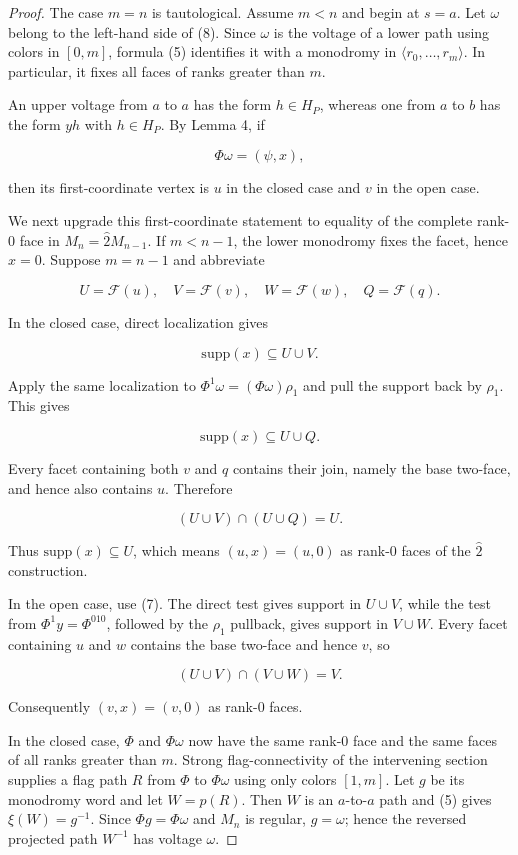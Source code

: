 \documentclass[11pt]{article}
\begin{document}
\begin{proof}

The case $m=n$ is tautological. Assume $m<n$ and begin at $s=a$. Let $\omega$ belong to the
left-hand side of (8). Since $\omega$ is the voltage of a lower path using colors in $[0,m]$, formula
(5) identifies it with a monodromy in $\langle r_0,\ldots,r_m\rangle$. In particular, it fixes all
faces of ranks greater than $m$.

An upper voltage from $a$ to $a$ has the form $h\in H_P$, whereas one from $a$ to $b$ has the form
$yh$ with $h\in H_P$. By Lemma 4, if

\[
\Phi\omega=(\psi,x),
\]

then its first-coordinate vertex is $u$ in the closed case and $v$ in the open case.

We next upgrade this first-coordinate statement to equality of the complete rank-$0$ face in
$M_n=\widehat2M_{n-1}$. If $m<n-1$, the lower monodromy fixes the facet, hence $x=0$. Suppose
$m=n-1$ and abbreviate

\[
U=\mathcal F(u),\quad V=\mathcal F(v),\quad
W=\mathcal F(w),\quad Q=\mathcal F(q).
\]

In the closed case, direct localization gives

\[
\mathrm{supp}(x)\subseteq U\cup V.
\]

Apply the same localization to $\Phi^1\omega=(\Phi\omega)\rho_1$ and pull the support back by
$\rho_1$. This gives

\[
\mathrm{supp}(x)\subseteq U\cup Q.
\]

Every facet containing both $v$ and $q$ contains their join, namely the base two-face, and hence also
contains $u$. Therefore

\[
(U\cup V)\cap(U\cup Q)=U.
\]

Thus $\mathrm{supp}(x)\subseteq U$, which means $(u,x)=(u,0)$ as rank-$0$ faces of the
$\widehat2$ construction.

In the open case, use (7). The direct test gives support in $U\cup V$, while the test from
$\Phi^1y=\Phi^{010}$, followed by the $\rho_1$ pullback, gives support in $V\cup W$. Every facet
containing $u$ and $w$ contains the base two-face and hence $v$, so

\[
(U\cup V)\cap(V\cup W)=V.
\]

Consequently $(v,x)=(v,0)$ as rank-$0$ faces.

In the closed case, $\Phi$ and $\Phi\omega$ now have the same rank-$0$ face and the same faces of
all ranks greater than $m$. Strong flag-connectivity of the intervening section supplies a flag path
$R$ from $\Phi$ to $\Phi\omega$ using only colors $[1,m]$. Let $g$ be its monodromy word and
let $W=p(R)$. Then $W$ is an $a$-to-$a$ path and (5) gives $\xi(W)=g^{-1}$. Since
$\Phi g=\Phi\omega$ and $M_n$ is regular, $g=\omega$; hence the reversed projected path $W^{-1}$
has voltage $\omega$.


\end{proof}
\end{document}
